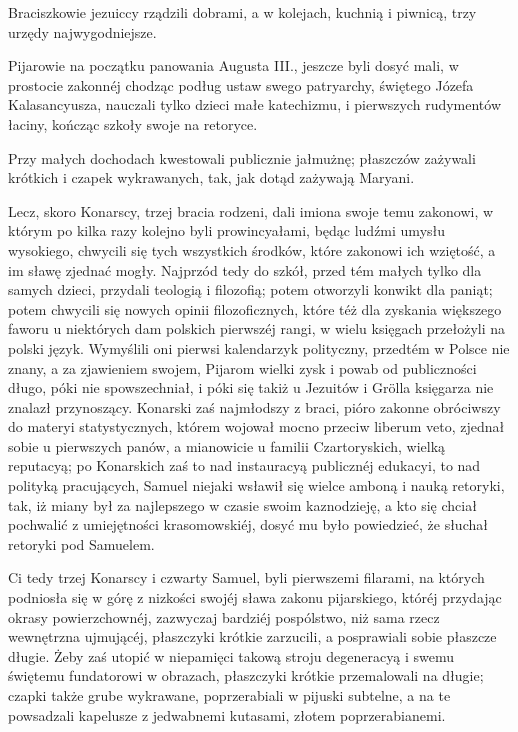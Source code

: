 \documentclass{book}
\begin{document}
Braciszkowie jezuiccy rządzili dobrami, a w kolejach, kuchnią i piwnicą, trzy urzędy najwygodniejsze.

Pijarowie na początku panowania Augusta III., jeszcze byli dosyć mali, w prostocie zakonnéj chodząc podług ustaw swego patryarchy, świętego Józefa Kalasancyusza, nauczali tylko dzieci małe katechizmu, i pierwszych rudymentów łaciny, kończąc szkoły swoje na retoryce.

Przy małych dochodach kwestowali publicznie jałmużnę; płaszczów zażywali krótkich i czapek wykrawanych, tak, jak dotąd zażywają Maryani.

Lecz, skoro Konarscy, trzej bracia rodzeni, dali imiona swoje temu zakonowi, w którym po kilka razy kolejno byli prowincyałami, będąc ludźmi umysłu wysokiego, chwycili się tych wszystkich środków, które zakonowi ich wziętość, a im sławę zjednać mogły. Najprzód tedy do szkół, przed tém małych tylko dla samych dzieci, przydali teologią i filozofią; potem otworzyli konwikt dla paniąt; potem chwycili się nowych opinii filozoficznych, które téż dla zyskania większego faworu u niektórych dam polskich pierwszéj rangi, w wielu księgach przełożyli na polski język. Wymyślili oni pierwsi kalendarzyk polityczny, przedtém w Polsce nie znany, a za zjawieniem swojem, Pijarom wielki zysk i powab od publiczności długo, póki nie spowszechniał, i póki się takiż u Jezuitów i Grölla księgarza nie znalazł przynoszący. Konarski zaś najmłodszy z braci, pióro zakonne obróciwszy do materyi statystycznych, którem wojował mocno przeciw liberum veto, zjednał sobie u pierwszych panów, a mianowicie u familii Czartoryskich, wielką reputacyą; po Konarskich zaś to nad instauracyą publicznéj edukacyi, to nad polityką pracujących, Samuel niejaki wsławił się wielce amboną i nauką retoryki, tak, iż miany był za najlepszego w czasie swoim kaznodzieję, a kto się chciał pochwalić z umiejętności krasomowskiéj, dosyć mu było powiedzieć, że słuchał retoryki pod Samuelem.

Ci tedy trzej Konarscy i czwarty Samuel, byli pierwszemi filarami, na których podniosła się w górę z nizkości swojéj sława zakonu pijarskiego, któréj przydając okrasy powierzchownéj, zazwyczaj bardziéj pospólstwo, niż sama rzecz wewnętrzna ujmującéj, płaszczyki krótkie zarzucili, a posprawiali sobie płaszcze długie. Żeby zaś utopić w niepamięci takową stroju degeneracyą i swemu świętemu fundatorowi w obrazach, płaszczyki krótkie przemalowali na długie; czapki także grube wykrawane, poprzerabiali w pijuski subtelne, a na te powsadzali kapelusze z jedwabnemi kutasami, złotem poprzerabianemi.
\end{document}
